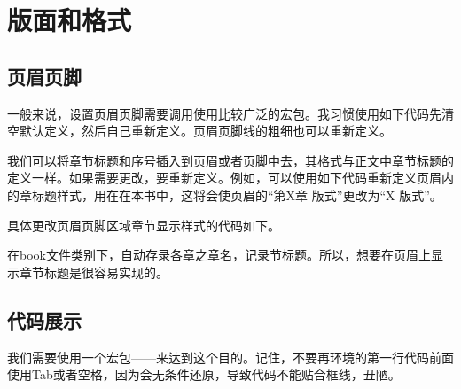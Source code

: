 \newpage

{\let\clearpage\relax \chapter{版面和格式}}

\section{页眉页脚}
一般来说，设置页眉页脚需要调用使用比较广泛的宏包。我习惯使用如下代码先清空默认定义，然后自己重新定义。页眉页脚线的粗细也可以重新定义。

\begin{latex}{}
\usepackage{fancyhdr}
\pagestyle{fancy}
\fancyhf{}					%
	\lhead{}				%
	\cfoot{}
	\fancyhead[RO,LE]{}		%
	\fancyfoot[LE,RO]{\thepage}
\renewcommand{\headrulewidth}{0.4 pt}
\renewcommand{\footrulewidth}{0.4 pt}
\end{latex}


我们可以将章节标题和序号插入到页眉或者页脚中去，其格式与正文中章节标题的定义一样。如果需要更改，要重新定义。例如，可以使用如下代码重新定义页眉内的章标题样式，用在在本书中，这将会使页眉的“第X章 版式”更改为“X 版式”。 

具体更改页眉页脚区域章节显示样式的代码如下。

\begin{latex}{}
\renewcommand{\chaptermark}[1]{\markleft{\thesection.\#1}}
\renewcommand{\chaptermark}[1]{\markboth{\thechapter.\ #1}{节样式空置表示修改章样式}}
\renewcommand{\chaptermark}[1]{\markboth{章样式}{节样式}}
\end{latex}


在book文件类别下，\qd{\leftmark}自动存录各章之章名，\qd{\rightmark}记录节标题。所以，想要在页眉上显示章节标题是很容易实现的。


\begin{latex}{}
\lhead{\leftmark}			%
\rhead{\rightmark}			%
\end{latex}


\section{代码展示}
我们需要使用一个宏包——来达到这个目的。记住，不要再环境的第一行代码前面使用Tab或者空格，因为会无条件还原，导致代码不能贴合框线，丑陋。

